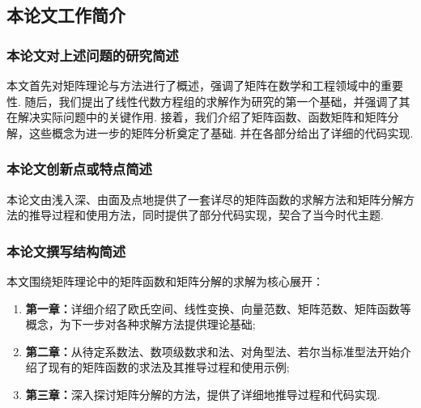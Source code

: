     \subsection{本论文工作简介}
        \subsubsection{本论文对上述问题的研究简述}
            \par 本文首先对矩阵理论与方法进行了概述，强调了矩阵在数学和工程领域中的重要性. 随后，我们提出了线性代数方程组的求解作为研究的第一个基础，并强调了其在解决实际问题中的关键作用. 接着，我们介绍了矩阵函数、函数矩阵和矩阵分解，这些概念为进一步的矩阵分析奠定了基础. 并在各部分给出了详细的代码实现.

        \subsubsection{本论文创新点或特点简述}
            \par 本论文由浅入深、由面及点地提供了一套详尽的矩阵函数的求解方法和矩阵分解方法的推导过程和使用方法，同时提供了部分代码实现，契合了当今时代主题.

        \subsubsection{本论文撰写结构简述}
            \par 本文围绕矩阵理论中的矩阵函数和矩阵分解的求解为核心展开：
            \begin{enumerate}
                \item \textbf{第一章：}详细介绍了欧氏空间、线性变换、向量范数、矩阵范数、矩阵函数等概念，为下一步对各种求解方法提供理论基础;
                \item \textbf{第二章：}从待定系数法、数项级数求和法、对角型法、若尔当标准型法开始介绍了现有的矩阵函数的求法及其推导过程和使用示例;
                \item \textbf{第三章：}深入探讨矩阵分解的方法，提供了详细地推导过程和代码实现.
            \end{enumerate}

